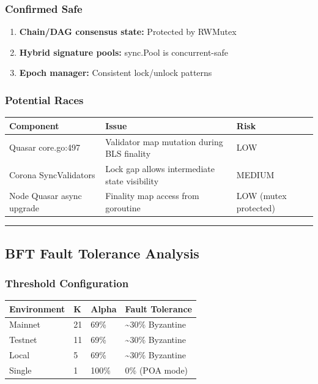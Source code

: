 \documentclass[
]{article}
\newcounter{none} %
\providecommand{\tightlist}{%
  \setlength{\itemsep}{0pt}\setlength{\parskip}{0pt}}
\begin{document}
\subsubsection{Confirmed Safe}\label{confirmed-safe}

\begin{enumerate}
\def\labelenumi{\arabic{enumi}.}
\tightlist
\item
  \textbf{Chain/DAG consensus state:} Protected by RWMutex
\item
  \textbf{Hybrid signature pools:} sync.Pool is concurrent-safe
\item
  \textbf{Epoch manager:} Consistent lock/unlock patterns
\end{enumerate}

\subsubsection{Potential Races}\label{potential-races}

{\def\LTcaptype{none} %
\begin{longtable}[]{@{}lll@{}}
\toprule\noalign{}
Component & Issue & Risk \\
\midrule\noalign{}
\endhead
\bottomrule\noalign{}
\endlastfoot
Quasar core.go:497 & Validator map mutation during BLS finality & LOW \\
Corona SyncValidators & Lock gap allows intermediate state visibility
& MEDIUM \\
Node Quasar async upgrade & Finality map access from goroutine & LOW
(mutex protected) \\
\end{longtable}
}

\begin{center}\rule{0.5\linewidth}{0.5pt}\end{center}

\subsection{BFT Fault Tolerance
Analysis}\label{bft-fault-tolerance-analysis}

\subsubsection{Threshold Configuration}\label{threshold-configuration}

{\def\LTcaptype{none} %
\begin{longtable}[]{@{}llll@{}}
\toprule\noalign{}
Environment & K & Alpha & Fault Tolerance \\
\midrule\noalign{}
\endhead
\bottomrule\noalign{}
\endlastfoot
Mainnet & 21 & 69\% & \textasciitilde30\% Byzantine \\
Testnet & 11 & 69\% & \textasciitilde30\% Byzantine \\
Local & 5 & 69\% & \textasciitilde30\% Byzantine \\
Single & 1 & 100\% & 0\% (POA mode) \\
\end{longtable}
}
\end{document}

